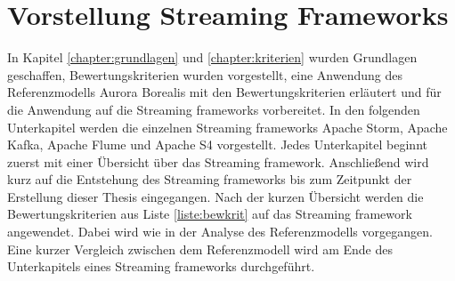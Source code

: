 \chapter{Vorstellung Streaming Frameworks}
\label{chapter:vorstellung}

In Kapitel \ref{chapter:grundlagen} und \ref{chapter:kriterien} wurden Grundlagen geschaffen, Bewertungskriterien wurden vorgestellt, eine Anwendung des Referenzmodells Aurora Borealis mit den Bewertungskriterien erläutert und für die Anwendung auf die Streaming frameworks vorbereitet. In den folgenden Unterkapitel werden die einzelnen Streaming frameworks Apache Storm, Apache Kafka, Apache Flume und Apache S4 vorgestellt. Jedes Unterkapitel beginnt zuerst mit einer Übersicht über das Streaming framework. Anschließend wird kurz auf die Entstehung des Streaming frameworks bis zum Zeitpunkt der Erstellung dieser Thesis eingegangen. Nach der kurzen Übersicht werden die Bewertungskriterien aus Liste \ref{liste:bewkrit} auf das Streaming framework angewendet. Dabei wird wie in der Analyse des Referenzmodells vorgegangen. Eine kurzer Vergleich zwischen dem Referenzmodell wird am Ende des Unterkapitels eines Streaming frameworks durchgeführt.









